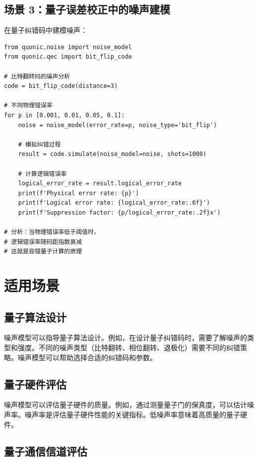 \documentclass[12pt,a4paper]{article}
\begin{document}
\subsection{场景 3：量子误差校正中的噪声建模}

在量子纠错码中建模噪声：

\begin{verbatim}
from quonic.noise import noise_model
from quonic.qec import bit_flip_code

# 比特翻转码的噪声分析
code = bit_flip_code(distance=3)

# 不同物理错误率
for p in [0.001, 0.01, 0.05, 0.1]:
    noise = noise_model(error_rate=p, noise_type='bit_flip')

    # 模拟纠错过程
    result = code.simulate(noise_model=noise, shots=1000)

    # 计算逻辑错误率
    logical_error_rate = result.logical_error_rate
    print(f'Physical error rate: {p}')
    print(f'Logical error rate: {logical_error_rate:.6f}')
    print(f'Suppression factor: {p/logical_error_rate:.2f}x')

# 分析：当物理错误率低于阈值时，
# 逻辑错误率随码距指数衰减
# 这就是容错量子计算的原理
\end{verbatim}

\section{适用场景}

\subsection{量子算法设计}

噪声模型可以指导量子算法设计。例如，在设计量子纠错码时，需要了解噪声的类型和强度。不同的噪声类型（比特翻转、相位翻转、退极化）需要不同的纠错策略。噪声模型可以帮助选择合适的纠错码和参数。

\subsection{量子硬件评估}

噪声模型可以评估量子硬件的质量。例如，通过测量量子门的保真度，可以估计噪声率。噪声率是评估量子硬件性能的关键指标。低噪声率意味着高质量的量子硬件。

\subsection{量子通信信道评估}
\end{document}
